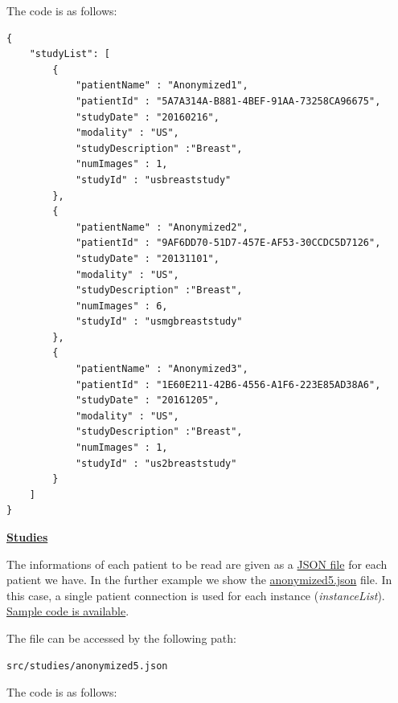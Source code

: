 \documentclass{tufte-book} %
\begin{document}
\hfill

The code is as follows:

\begin{lstlisting}
{
    "studyList": [
        {
            "patientName" : "Anonymized1",
            "patientId" : "5A7A314A-B881-4BEF-91AA-73258CA96675",
            "studyDate" : "20160216",
            "modality" : "US",
            "studyDescription" :"Breast",
            "numImages" : 1,
            "studyId" : "usbreaststudy"
        },
        {
            "patientName" : "Anonymized2",
            "patientId" : "9AF6DD70-51D7-457E-AF53-30CCDC5D7126",
            "studyDate" : "20131101",
            "modality" : "US",
            "studyDescription" :"Breast",
            "numImages" : 6,
            "studyId" : "usmgbreaststudy"
        },
        {
            "patientName" : "Anonymized3",
            "patientId" : "1E60E211-42B6-4556-A1F6-223E85AD38A6",
            "studyDate" : "20161205",
            "modality" : "US",
            "studyDescription" :"Breast",
            "numImages" : 1,
            "studyId" : "us2breaststudy"
        }
    ]
}
\end{lstlisting}


\clearpage


\href{https://github.com/MIMBCD-UI/prototype-cornerstone/wiki/Image-Processing#studies-1}{\textbf{Studies}}

\hfill

The informations of each patient to be read are given as a \href{https://en.wikipedia.org/wiki/JSON}{JSON file} for each patient we have. In the further example we show the \href{https://github.com/MIMBCD-UI/prototype-cornerstone/blob/master/src/studies/anonymized5.json}{anonymized5.json} file. In this case, a single patient connection is used for each instance (\textit{instanceList}). \href{https://github.com/MIMBCD-UI/prototype-cornerstone/wiki/Image-Processing#studies-1}{Sample code is available}.

\hfill

The file can be accessed by the following path:

\begin{lstlisting}
src/studies/anonymized5.json
\end{lstlisting}

\hfill

The code is as follows:
\end{document}

